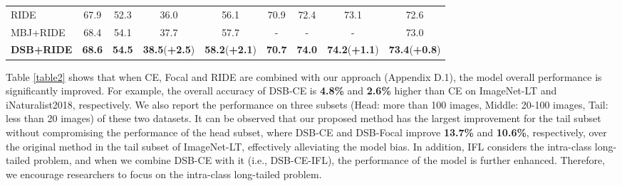 \documentclass[10pt]{article} %
\begin{document}
\begin{table}[h]
\begin{tabular}{l|cccc| cccc }
RIDE \cite {paper71} &67.9 & 52.3 & 36.0 & 56.1 & 70.9  & 72.4 & 73.1 & 72.6 \\
MBJ+RIDE \cite {paper72} &68.4 & 54.1 & 37.7 & 57.7 & \multicolumn{1}{c}{-}  & \multicolumn{1}{c}{-} & \multicolumn{1}{c}{-} & 73.0 \\
\textbf{DSB+RIDE} &\textbf{68.6} & \textbf{54.5} & \textbf{38.5}(\textcolor[RGB]{0,201,87}{\textbf{+2.5}}) & \textbf{58.2}(\textcolor[RGB]{0,201,87}{\textbf{+2.1}}) &\textbf{70.7}  & \textbf{74.0} & \textbf{74.2}(\textcolor[RGB]{0,201,87}{\textbf{+1.1}}) & \textbf{73.4}(\textcolor[RGB]{0,201,87}{\textbf{+0.8}}) \\  

\bottomrule \hline
 \end{tabular}
\end{table}

Table \ref{table2} shows that when CE, Focal \cite {paper68} and RIDE  are combined with our approach (Appendix D.1), the model overall performance is significantly improved. For example, the overall accuracy of DSB-CE is \textbf{4.8\%} and \textbf{2.6\%} higher than CE on ImageNet-LT and iNaturalist2018, respectively. We also report the performance on three subsets (Head: more than 100 images, Middle: 20-100 images, Tail: less than 20 images) of these two datasets. It can be observed that our proposed method has the largest improvement for the tail subset without compromising the performance of the head subset, where DSB-CE and DSB-Focal improve \textbf{13.7\%} and \textbf{10.6\%}, respectively, over the original method in the tail subset of ImageNet-LT, effectively alleviating the model bias. In addition, IFL \cite{paper115} considers the intra-class long-tailed problem, and when we combine DSB-CE with it (i.e., DSB-CE-IFL), the performance of the model is further enhanced. Therefore, we encourage researchers to focus on the intra-class long-tailed problem.
\end{document}
